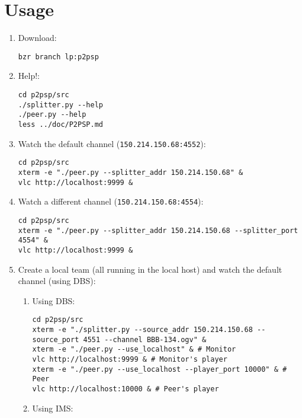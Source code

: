 \documentclass{article}
\begin{document}

\section{Usage}

\begin{enumerate}

\item Download:

\begin{verbatim}
bzr branch lp:p2psp
\end{verbatim}

\item Help!:

\begin{verbatim}
cd p2psp/src
./splitter.py --help
./peer.py --help
less ../doc/P2PSP.md
\end{verbatim}

\item Watch the default channel ({\tt 150.214.150.68:4552}):

\begin{verbatim}
cd p2psp/src
xterm -e "./peer.py --splitter_addr 150.214.150.68" &
vlc http://localhost:9999 &
\end{verbatim}

\item Watch a different channel ({\tt 150.214.150.68:4554}):

\begin{verbatim}
cd p2psp/src
xterm -e "./peer.py --splitter_addr 150.214.150.68 --splitter_port 4554" &
vlc http://localhost:9999 &
\end{verbatim}

\item Create a local team (all running in the local host) and watch the
  default channel (using DBS):

\begin{enumerate}
\item Using DBS:
\begin{verbatim}
cd p2psp/src
xterm -e "./splitter.py --source_addr 150.214.150.68 --source_port 4551 --channel BBB-134.ogv" &
xterm -e "./peer.py --use_localhost" & # Monitor
vlc http://localhost:9999 & # Monitor's player
xterm -e "./peer.py --use_localhost --player_port 10000" & # Peer
vlc http://localhost:10000 & # Peer's player
\end{verbatim}

\item Using IMS:


\end{enumerate}
\end{enumerate}
\end{document}
